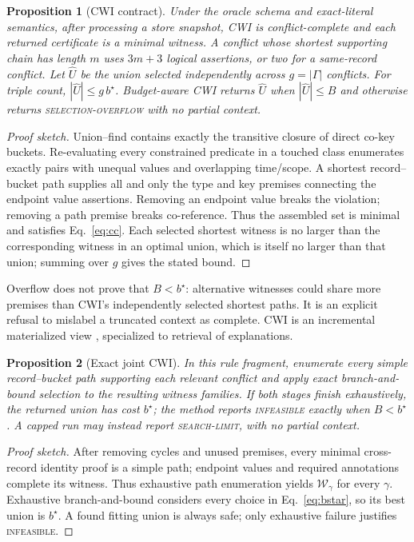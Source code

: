 \documentclass[letterpaper]{article} %
\newtheorem{proposition}{Proposition}
\newcommand{\cwi}{\textsc{CWI}}
\newcommand{\W}{\mathcal{W}}
\begin{document}
\begin{proposition}[\cwi{} contract]
Under the oracle schema and exact-literal semantics, after processing a store
snapshot, \cwi{} is conflict-complete and each returned certificate is a
minimal witness.  A conflict whose shortest supporting chain has length $m$
uses $3m+3$ logical assertions, or two for a same-record conflict.  Let
$\widehat U$ be the union selected independently across $g=|\Gamma|$
conflicts.  For triple count, $|\widehat U|\le g\,b^\star$.  Budget-aware
\cwi{} returns $\widehat U$ when $|\widehat U|\le B$ and otherwise returns
\textsc{selection-overflow} with no partial context.
\end{proposition}
\begin{proof}[Proof sketch]
Union--find contains exactly the transitive closure of direct co-key buckets.
Re-evaluating every constrained predicate in a touched class enumerates
exactly pairs with unequal values and overlapping time/scope.  A shortest
record--bucket path supplies all and only the type and key premises connecting
the endpoint value assertions.  Removing an endpoint value breaks the
violation; removing a path premise breaks co-reference.  Thus the assembled
set is minimal and satisfies Eq.~\ref{eq:cc}.  Each selected shortest witness
is no larger than the corresponding witness in an optimal union, which is
itself no larger than that union; summing over $g$ gives the stated bound.
\end{proof}

Overflow does not prove that $B<b^\star$: alternative witnesses could share
more premises than \cwi's independently selected shortest paths.  It is an
explicit refusal to mislabel a truncated context as complete.  \cwi{} is an
incremental materialized view
\citep{gupta1993ivm}, specialized to retrieval of explanations.

\begin{proposition}[Exact joint \cwi{}]
\label{prop:exactjoint}
In this rule fragment, enumerate every simple record--bucket path supporting
each relevant conflict and apply exact branch-and-bound selection to the
resulting witness families.  If both stages finish exhaustively, the returned
union has cost $b^\star$; the method reports \textsc{infeasible} exactly when
$B<b^\star$.  A capped run may instead report \textsc{search-limit}, with no
partial context.
\end{proposition}
\begin{proof}[Proof sketch]
After removing cycles and unused premises, every minimal cross-record identity
proof is a simple path; endpoint values and required annotations complete its
witness.  Thus exhaustive path enumeration yields $\W_\gamma$ for every
$\gamma$.  Exhaustive branch-and-bound considers every choice in
Eq.~\ref{eq:bstar}, so its best union is $b^\star$.  A found fitting union is
always safe; only exhaustive failure justifies \textsc{infeasible}.
\end{proof}
\end{document}
